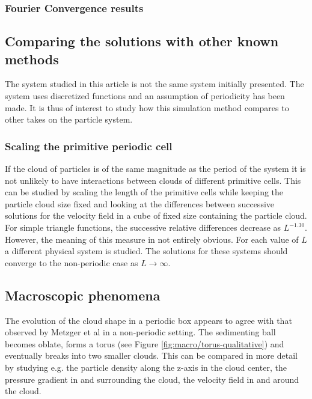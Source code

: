 \documentclass[a4paper,
twoside=false,abstract=false,numbers=noenddot,
titlepage=false,headings=small,parskip=half,version=last]{scrartcl}
\begin{document}
\subsubsection{Fourier Convergence results}

\subsection{Comparing the solutions with other known methods}
The system studied in this article is not the same system initially presented. The system uses discretized functions and an assumption of  periodicity has been made. It is thus of interest to study how this simulation method compares to other takes on the particle system.
\subsubsection{Scaling the primitive periodic cell}\label{cellscale}
If the cloud of particles is of the same magnitude as the period of the system it is not unlikely to have interactions between clouds of different primitive cells.
This can be studied by scaling the length of the primitive cells while keeping the particle cloud size fixed and looking at the differences between successive solutions for the velocity field in a cube of fixed size containing the particle cloud.
For simple triangle functions, the successive relative differences decrease as $L^{-1.30}$.
However, the meaning of this measure in not entirely obvious.
For each value of $L$ a different physical system is studied. The solutions for these systems should converge to the non-periodic case as $L\rightarrow \infty$.

\subsection{Macroscopic phenomena}
The evolution of the cloud shape in a periodic box appears to agree with that observed by Metzger et al \cite{fallingclouds} in a non-periodic setting.
The sedimenting ball becomes oblate, forms a torus (see Figure \ref{fig:macro/torus-qualitative}) and eventually breaks into two smaller clouds.
This can be compared in more detail by studying e.g. the particle density along the z-axis in the cloud center, the pressure gradient in and surrounding the cloud, the velocity field in and around the cloud.\\
\end{document}

